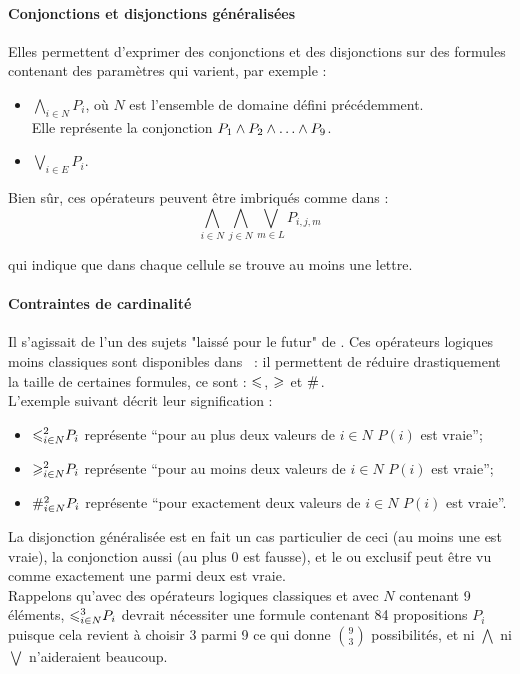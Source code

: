 \paragraph{Conjonctions et disjonctions généralisées}
Elles permettent d'exprimer des conjonctions et des disjonctions sur des formules contenant des paramètres qui varient, par exemple :
\begin{itemize}
\item $ \bigwedge_{i \in N} P_i$, o\`u $N$ est l'ensemble de domaine défini précédemment.\\
  Elle représente la conjonction
  $P_1 \wedge P_2 \wedge \ldots \wedge P_9$. 
\item $\bigvee_{i \in E} P_i$.
\end{itemize}

Bien s\^ur, ces opérateurs peuvent être imbriqués comme dans :
$$\bigwedge_{i \in N} \bigwedge_{j \in N}\bigvee_{ m\in L}P_{i,j,m}$$

qui indique que dans chaque cellule se trouve au moins une lettre.


\paragraph{Contraintes de cardinalité}
Il s'agissait de l'un des sujets "laissé pour le futur" de \cite{GaScSt2011}.
Ces opérateurs logiques moins classiques sont disponibles dans \nameTool\ : il permettent de réduire drastiquement la taille de certaines formules, ce sont : ${\Large \leqslant}_{}^{}$, ${\Large \geqslant}_{}^{}$ et ${\Large \#}_{}^{}$.\\ L'exemple suivant décrit leur signification :
\begin{itemize}
\item ${\Large \leqslant}_{i \in N}^{2} P_i$ représente ``pour au plus deux valeurs de $i \in N$ $P(i)$ est vraie'';
\item ${\Large \geqslant}_{i \in N}^{2} P_i$ représente ``pour au moins deux valeurs de $i \in N$ $P(i)$ est vraie'';
\item ${\Large \#}_{i \in N}^{2} P_i$ représente ``pour exactement deux valeurs de $i \in N$ $P(i)$ est vraie''.
\end{itemize}
La disjonction généralisée est en fait un cas particulier de ceci (au moins une est vraie), la conjonction aussi (au plus 0 est fausse), et le ou exclusif peut être vu comme exactement une parmi deux est vraie. \\
Rappelons qu'avec des opérateurs logiques classiques et avec $N$ contenant 9 éléments, ${\Large \leqslant}_{i \in N}^{3} P_i$ devrait nécessiter une formule contenant 84 propositions $P_i$ puisque cela revient à choisir 3 parmi 9 ce qui donne $\binom{9}{3}$ possibilités, et ni $\bigwedge$ ni $\bigvee$ n'aideraient beaucoup. 

